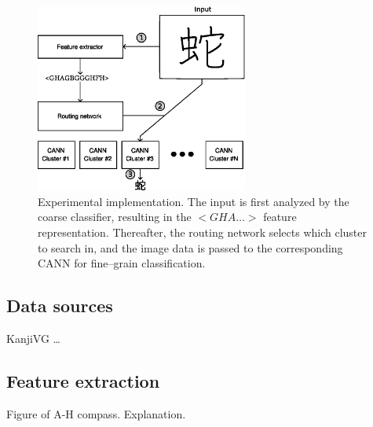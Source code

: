 \documentclass[10pt,conference,a4paper]{IEEEtran}
\begin{document}
	\begin{figure}
		\centering
		\includegraphics[width=2.75in]{./fig/experimental-implementation.eps}
		\caption{Experimental implementation. The input is first analyzed by the coarse classifier, resulting in the $<GHA\ldots>$ feature representation.
		Thereafter, the routing network selects which cluster to search in, and the image data is passed to the corresponding CANN for fine--grain classification.}
		\label{fig_experimental_implementation}
	\end{figure}



	\subsection{Data sources}

	KanjiVG \ldots


	\subsection{Feature extraction}

	Figure of A-H compass. Explanation.
\end{document}
